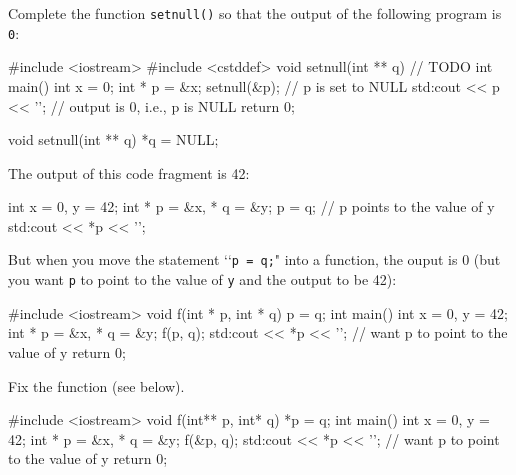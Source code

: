 

\nextq
Complete the function \verb!setnull()! so that the output
of the following program is \verb!0!:
\begin{console}[fontsize=\small]
#include <iostream>
#include <cstddef>
void setnull(int ** q)
{
    // TODO
}
int main()
{
    int x = 0;
    int * p = &x;
    setnull(&p);           // p is set to NULL
    std:cout << p << '\n'; // output is 0, i.e., p is NULL
    return 0;
}
\end{console}
\ANSWER
\begin{answercode}
void setnull(int ** q)
{
  *q = NULL;
}
\end{answercode}

\newpage
\nextq
The output of this code fragment is 42:
\begin{console}[fontsize=\small]
int x = 0, y = 42;
int * p = &x, * q = &y;
p = q;                  // p points to the value of y
std:cout << *p << '\n';
\end{console}
But when you move the statement \lq\lq \verb!p = q;!" into a function,
the ouput is 0 (but you want \verb!p! to point to the value of \verb!y!
and the output to be 42):
\begin{console}[fontsize=\small]
#include <iostream>
void f(int * p, int * q)
{
    p = q;
}
int main()
{
    int x = 0, y = 42;
    int * p = &x, * q = &y;
    f(p, q);
    std:cout << *p << '\n'; // want p to point to the value of y
    return 0;
}
\end{console}
Fix the function (see below).
\\ \ANSWER
\begin{answercode}
#include <iostream>
void f(int** p, int* q)
{
  *p = q;
}
int main()
{
    int x = 0, y = 42;
    int * p = &x, * q = &y;
    f(&p, q);
    std:cout << *p << '\n'; // want p to point to the value of y
    return 0;
}
\end{answercode}


